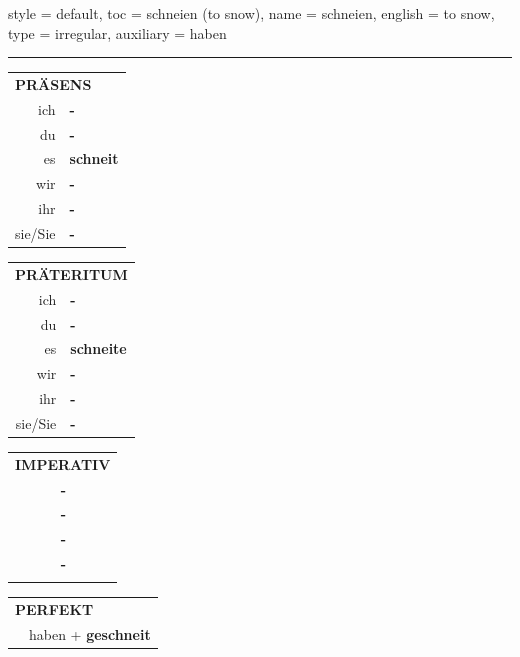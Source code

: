\begin{verbentry}{
  style = {default},
  toc = {schneien (to snow)},
  name = {schneien},
  english = {to snow},
  type = {irregular},
  auxiliary = {haben}
}
 
    
     \vspace{5pt}

    \hrule
    
    \vspace{5pt}

  \begin{tabular}{rl}
     \multicolumn{2}{l}{\textbf{PRÄSENS} }\\
    ich & \textbf{-}\\
    du & \textbf{-}\\
    es & \textbf{schneit}\\
    wir & \textbf{-}\\
    ihr & \textbf{-}\\
    sie/Sie & \textbf{-}\\
  \end{tabular}
  \hfill
     \begin{tabular}{rl}
    \multicolumn{2}{l}{\textbf{PRÄTERITUM} }\\
    ich & \textbf{-}\\
    du & \textbf{-}\\
    es & \textbf{schneite}\\
    wir & \textbf{-}\\
    ihr & \textbf{-}\\
    sie/Sie & \textbf{-}\\
  \end{tabular}
  \hfill
  \begin{tabular}{rl}
     \multicolumn{2}{l}{\textbf{IMPERATIV} }\\
   & \textbf{-}\\
   & \textbf{-}\\
   & \textbf{-}\\
   & \textbf{-}\\
   & \vspace{10pt}
  \end{tabular}

    \vspace{10pt}

 \begin{tabular}{rl}
     \multicolumn{2}{l}{\textbf{PERFEKT}}\\
  &  haben + \textbf{geschneit}\\
  \end{tabular}
\hfill
   \begin{tabular}{rl}
   

\end{tabular}
\end{verbentry}
